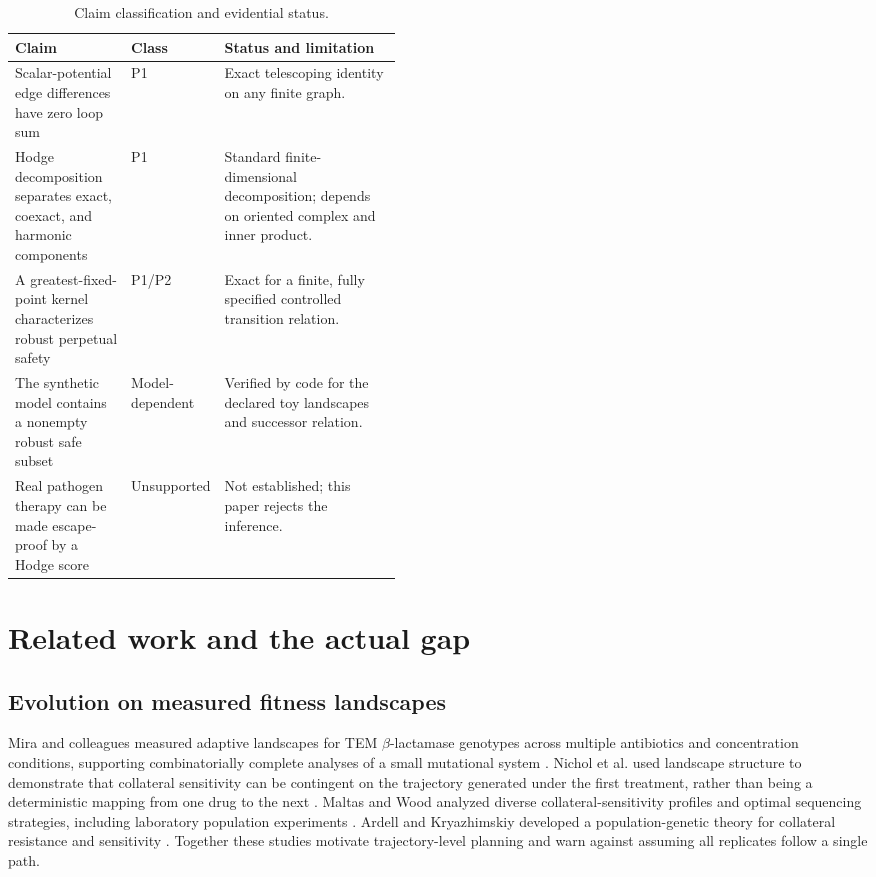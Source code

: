 \documentclass[11pt]{article}
\theoremstyle{definition}\newtheorem{definition}[proposition]{Definition}\theoremstyle{remark}\newtheorem{remark}[proposition]{Remark}
\begin{document}
\begin{table}[htbp]\centering\small\caption{Claim classification and evidential status.}\label{tab:claims}\begin{tabularx}{\linewidth}{p{0.30\linewidth}p{0.15\linewidth}X}\toprule Claim & Class & Status and limitation\\\midrule Scalar-potential edge differences have zero loop sum & P1 & Exact telescoping identity on any finite graph.\\ Hodge decomposition separates exact, coexact, and harmonic components & P1 & Standard finite-dimensional decomposition; depends on oriented complex and inner product.\\ A greatest-fixed-point kernel characterizes robust perpetual safety & P1/P2 & Exact for a finite, fully specified controlled transition relation.\\ The synthetic model contains a nonempty robust safe subset & Model-dependent & Verified by code for the declared toy landscapes and successor relation.\\ Real pathogen therapy can be made escape-proof by a Hodge score & Unsupported & Not established; this paper rejects the inference.\\\bottomrule\end{tabularx}\end{table}

\section{Related work and the actual gap}
\subsection{Evolution on measured fitness landscapes}
Mira and colleagues measured adaptive landscapes for TEM $\beta$-lactamase genotypes across multiple antibiotics and concentration conditions, supporting combinatorially complete analyses of a small mutational system \citep{Mira2015}. Nichol et al. used landscape structure to demonstrate that collateral sensitivity can be contingent on the trajectory generated under the first treatment, rather than being a deterministic mapping from one drug to the next \citep{Nichol2019}. Maltas and Wood analyzed diverse collateral-sensitivity profiles and optimal sequencing strategies, including laboratory population experiments \citep{MaltasWood2019}. Ardell and Kryazhimskiy developed a population-genetic theory for collateral resistance and sensitivity \citep{ArdellKryazhimskiy2021}. Together these studies motivate trajectory-level planning and warn against assuming all replicates follow a single path.
\end{document}
